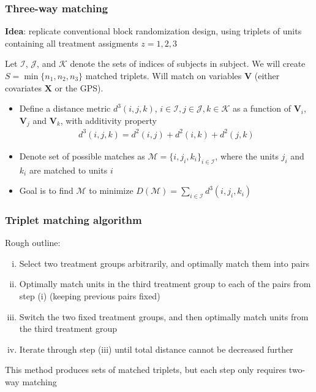 
\begin{frame}
  \frametitle{Three-way matching}
  
  \textbf{Idea}: replicate conventional block randomization design,
  using triplets of units containing all treatment assigments
  $z=1,2,3$ \medskip 

  Let $\mathcal{I}$, $\mathcal{J}$, and $\mathcal{K}$ denote the sets
  of indices of subjects in subject.  We will create
  $S = \min\{n_1, n_2, n_3\}$ matched triplets.  Will match on
  variables $\mathbf{V}$ (either covariates $\mathbf{X}$ or the GPS).
  \medskip

  \begin{itemize}
  \item Define a distance metric $d^3(i,j,k)$, $i \in \mathcal{I},
    j \in \mathcal{J}, k\in\mathcal{K} $ as a function of
    $\mathbf{V}_i$, $\mathbf{V}_j$ and $\mathbf{V}_k$, with additivity property
    \begin{align*}
      d^3(i,j,k) = d^2(i,j) + d^2(i,k) + d^2(j,k)
    \end{align*}
  \item Denote set of possible matches as
    $\mathcal{M} = \{i, j_i, k_i\}_{i \in \mathcal{I}}$, where the
    units $j_i$ and $k_i$ are matched to units $i$ \medskip 
  \item Goal is to find $\mathcal{M}$ to minimize
    $D(\mathcal{M}) = \sum_{i\in\mathcal{I}}^{}d^3(i,j_i,k_i)$
  \end{itemize}



\end{frame}





\begin{frame}
  \frametitle{Triplet matching algorithm}
  
  Rough outline: \medskip

  
  \begin{enumerate}[(i)]
  \item Select two treatment groups arbitrarily, and optimally match
    them into pairs \medskip 
  \item Optimally match units in the third treatment group to each of
    the pairs from step \textcolor{burntorange}{(i)} (keeping previous
    pairs fixed) \medskip 
  \item Switch the two fixed treatment groups, and then optimally
    match units from the third treatment group \medskip
  \item Iterate through step \textcolor{burntorange}{(iii)} until
    total distance cannot be decreased further
  \end{enumerate}

  \medskip 

  This method produces sets of matched triplets, but each step only
  requires two-way matching

  
\end{frame}

